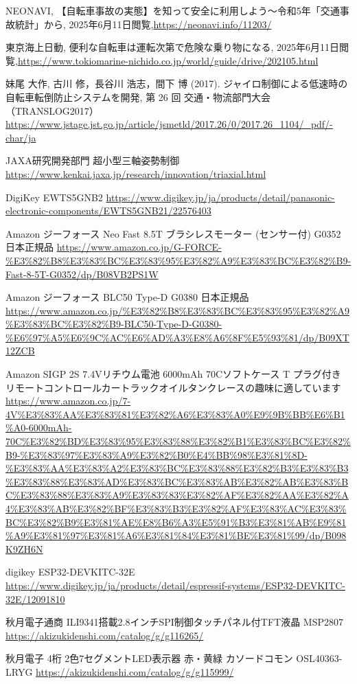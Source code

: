 \documentclass[uplatex,dvipdfmx]{jsarticle}
\begin{document}
\begin{thebibliography}{11}

 NEONAVI, 【自転車事故の実態】を知って安全に利用しよう～令和5年「交通事故統計」から, 
2025年6月11日閲覧,\url{https://neonavi.info/11203/}

 東京海上日動, 便利な自転車は運転次第で危険な乗り物になる, 
2025年6月11日閲覧,\url{https://www.tokiomarine-nichido.co.jp/world/guide/drive/202105.html}

 妹尾 大作, 古川 修，長谷川 浩志，間下 博 (2017). ジャイロ制御による低速時の
自転車転倒防止システムを開発, 第 26 回 交通・物流部門大会（TRANSLOG2017） 
\url{https://www.jstage.jst.go.jp/article/jsmetld/2017.26/0/2017.26_1104/_pdf/-char/ja}

JAXA研究開発部門 超小型三軸姿勢制御 
\url{https://www.kenkai.jaxa.jp/research/innovation/triaxial.html}


DigiKey EWTS5GNB2  \url{https://www.digikey.jp/ja/products/detail/panasonic-electronic-components/EWTS5GNB21/22576403}

Amazon ジーフォース Neo Fast 8.5T ブラシレスモーター (センサー付) G0352 日本正規品 \url{https://www.amazon.co.jp/G-FORCE-%E3%82%B8%E3%83%BC%E3%83%95%E3%82%A9%E3%83%BC%E3%82%B9-Fast-8-5T-G0352/dp/B08VB2PS1W}

Amazon ジーフォース BLC50 Type-D G0380 日本正規品
\url{https://www.amazon.co.jp/%E3%82%B8%E3%83%BC%E3%83%95%E3%82%A9%E3%83%BC%E3%82%B9-BLC50-Type-D-G0380-%E6%97%A5%E6%9C%AC%E6%AD%A3%E8%A6%8F%E5%93%81/dp/B09XT12ZCB}

Amazon SIGP 2S 7.4Vリチウム電池 6000mAh 70Cソフトケース T プラグ付き リモートコントロールカートラックオイルタンクレースの趣味に適しています
\url{https://www.amazon.co.jp/7-4V%E3%83%AA%E3%83%81%E3%82%A6%E3%83%A0%E9%9B%BB%E6%B1%A0-6000mAh-70C%E3%82%BD%E3%83%95%E3%83%88%E3%82%B1%E3%83%BC%E3%82%B9-%E3%83%97%E3%83%A9%E3%82%B0%E4%BB%98%E3%81%8D-%E3%83%AA%E3%83%A2%E3%83%BC%E3%83%88%E3%82%B3%E3%83%B3%E3%83%88%E3%83%AD%E3%83%BC%E3%83%AB%E3%82%AB%E3%83%BC%E3%83%88%E3%83%A9%E3%83%83%E3%82%AF%E3%82%AA%E3%82%A4%E3%83%AB%E3%82%BF%E3%83%B3%E3%82%AF%E3%83%AC%E3%83%BC%E3%82%B9%E3%81%AE%E8%B6%A3%E5%91%B3%E3%81%AB%E9%81%A9%E3%81%97%E3%81%A6%E3%81%84%E3%81%BE%E3%81%99/dp/B098K9ZH6N}

digikey ESP32-DEVKITC-32E \url{https://www.digikey.jp/ja/products/detail/espressif-systems/ESP32-DEVKITC-32E/12091810}

秋月電子通商 ILI9341搭載2.8インチSPI制御タッチパネル付TFT液晶 MSP2807
\url{https://akizukidenshi.com/catalog/g/g116265/}


秋月電子 4桁 2色7セグメントLED表示器 赤・黄緑 カソードコモン OSL40363-LRYG
\url{https://akizukidenshi.com/catalog/g/g115999/}

\end{thebibliography}
\end{document}

